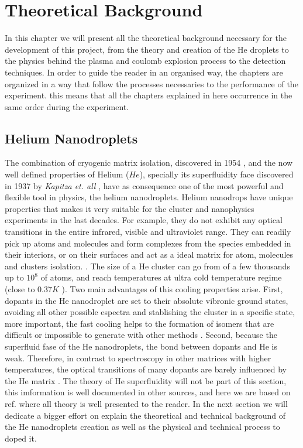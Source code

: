 \chapter{Theoretical Background}

In this chapter we will present all the theoretical background necessary for the development of this project, from the theory and creation of the He droplets to the physics behind the plasma and coulomb explosion process to the detection techniques. In order to guide the reader in an organised way, the chapters are organized in a way that follow the processes necessaries to the performance of the experiment. this means that all the chapters explained in here occurrence in the same order during the experiment.


\section{Helium Nanodroplets}

The combination of cryogenic matrix isolation, discovered in 1954 \cite{whittle_matrix_1954}, and the now well defined properties of Helium ($He$), specially its superfluidity face discovered in 1937 by \textit{Kapitza et. all}            \cite{kapitza_viscosity_1938}, have as consequence one of the most powerful and flexible tool in physics, the helium nanodroplets.
Helium nanodrops  have unique properties that makes it  very suitable for the cluster and nanophysics experiments in the last decades. For example, they do not exhibit any optical transitions in the entire infrared, visible and ultraviolet range. They can readily pick up atoms and molecules and  form complexes from the species embedded in their interiors, or on their surfaces and act as a ideal matrix for atom, molecules and clusters isolation. \cite{stienkemeier_spectroscopy_2006}\cite{toennies_superfluid_2004}.
The size of a He cluster can go from of a few thousands up to $10^{8}$ of atoms, and reach temperatures at   ultra cold temperature regime (close to 0.37$K$ \cite{toennies_spectroscopy_1998})\cite{enss_low-temperature_2005}.
Two main advantages of this  cooling properties arise. First,  dopants in the He nanodroplet are set to their absolute vibronic ground states, avoiding all other possible espectra and stablishing the cluster in a specific state, more important, the fast cooling helps to the formation of isomers that are difficult or impossible to generate with other methods \cite{nauta_nonequilibrium_1999}. Second, because the superfluid fase of the He nanodroplets\cite{grebenev_superfluidity_1998}, the bond between dopants and He is weak. Therefore, in contrast to spectroscopy in other matrices with higher temperatures, the optical transitions of many dopants are barely influenced by the He matrix \cite{toennies_superfluid_2004}. 
The theory of  He superfluidity will not be part of this section, this imformation is well documented in other sources, and here we are based on ref.\cite{enss_low-temperature_2005} where all theory is well presented to the reader. In the next section we will dedicate a bigger effort on explain the theoretical and technical background of the He nanodroplets creation as well as the physical and technical process to doped it. 

